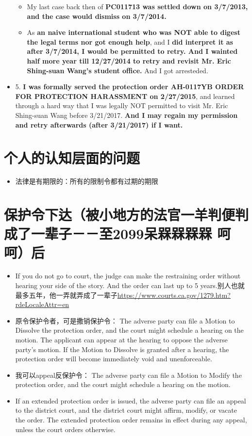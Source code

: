 \documentclass[9pt, b5paper]{article}
\begin{document}
\begin{itemize}
\begin{itemize}
\item My last case back then of \textbf{PC011713 was settled down on 3/7/2013, and the case would dismiss on 3/7/2014.}
\item As \textbf{an naive international student who was NOT able to digest the legal terms nor got enough help}, and I \textbf{did interpret it as after 3/7/2014, I would be permitted to retry. And I wainted half more year till 12/27/2014 to retry and revisit Mr. Eric Shing-suan Wang's student office.} And I got arresteded.
\end{itemize}
\item 5. \textbf{I was formally served the protection order AH-0117YB ORDER FOR PROTECTION HARASSMENT on 2/27/2015}, and learned through a hard way that I was legally NOT permitted to visit Mr. Eric Shing-suan Wang before 3/21/2017. \textbf{And I may regain my permission and retry afterwards (after 3/21/2017) if I want.}
\end{itemize}

\section{个人的认知层面的问题　　}
\label{sec-5}
\begin{itemize}
\item 法律是有期限的：所有的限制令都有过期的期限
\end{itemize}
\section{保护令下达（被小地方的法官一羊判便判成了一辈子－－至2099呆槑槑槑槑 呵呵）后}
\label{sec-6}
\begin{itemize}
\item If you do not go to court, the judge can make the restraining order without hearing your side of the story. And the order can last up to 5 years.别人也就最多五年，他一弄就弄成了一辈子\url{https://www.courts.ca.gov/1279.htm?rdeLocaleAttr=en}
\item 原令保护令者，可是撒销保护令： The adverse party can file a Motion to Dissolve the protection order, and the court might schedule a hearing on the motion. The applicant can appear at the hearing to oppose the adverse party’s motion. If the Motion to Dissolve is granted after a hearing, the protection order will become immediately void and unenforceable.
\item 我可以appeal反保护令： The adverse party can file a Motion to Modify the protection order, and the court might schedule a hearing on the motion.
\item If an extended protection order is issued, the adverse party can file an appeal to the district court, and the district court might affirm, modify, or vacate the order. The extended protection order remains in effect during any appeal, unless the court orders otherwise.
\end{itemize}
\end{document}
